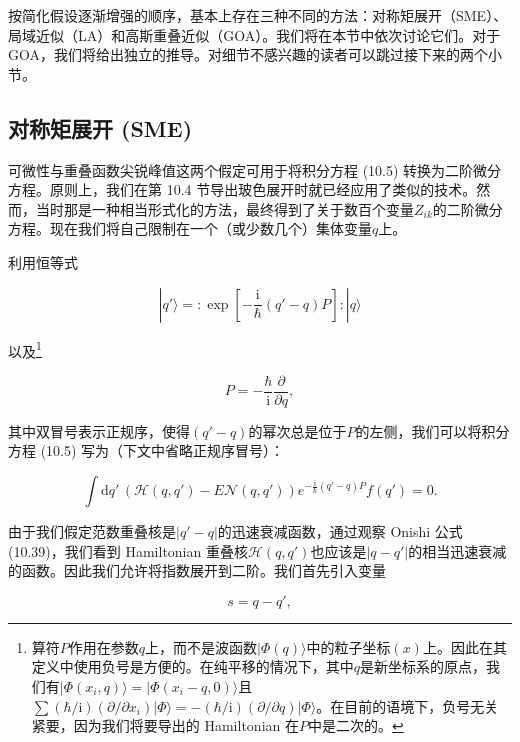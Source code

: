 按简化假设逐渐增强的顺序，基本上存在三种不同的方法：对称矩展开（SME）、局域近似（LA）和高斯重叠近似（GOA）。我们将在本节中依次讨论它们。对于
GOA，我们将给出独立的推导。对细节不感兴趣的读者可以跳过接下来的两个小节。

\subsection{对称矩展开 (SME)}

可微性与重叠函数尖锐峰值这两个假定可用于将积分方程 (10.5) 转换为二阶微分方程。原则上，我们在第 10.4 节导出玻色展开时就已经应用了类似的技术。然而，当时那是一种相当形式化的方法，最终得到了关于数百个变量$Z_{ik}$的二阶微分方程。现在我们将自己限制在一个（或少数几个）集体变量$q$上。

利用恒等式

\begin{equation}
|q'\rangle={:}\exp\left[-\frac{\mathrm{i}}{\hbar}(q'-q)P\right]{:}|q\rangle\label{eq:10.91}
\end{equation}

以及\footnote{算符$P$作用在参数$q$上，而不是波函数$|\Phi(q)\rangle$中的粒子坐标$(x)$上。因此在其定义中使用负号是方便的。在纯平移的情况下，其中$q$是新坐标系的原点，我们有$|\Phi(x_{i},q)\rangle=|\Phi(x_{i}-q,0)\rangle$且$\sum(\hbar/\mathrm{i})(\partial/\partial x_{i})|\Phi\rangle=-(\hbar/\mathrm{i})(\partial/\partial q)|\Phi\rangle$。在目前的语境下，负号无关紧要，因为我们将要导出的
Hamiltonian 在$P$中是二次的。}

\begin{equation}
P=-\frac{\hbar}{\mathrm{i}}\frac{\partial}{\partial q},\label{eq:10.92}
\end{equation}

其中双冒号表示正规序，使得$(q'-q)$的幂次总是位于$P$的左侧，我们可以将积分方程 (10.5) 写为（下文中省略正规序冒号）：

\begin{equation}
\int\mathrm{d}q'\,(\mathscr{H}(q,q')-E\mathscr{N}(q,q'))e^{-\frac{\mathrm{i}}{\hbar}(q'-q)P}f(q')=0.\label{eq:10.93}
\end{equation}

由于我们假定范数重叠核是$|q'-q|$的迅速衰减函数，通过观察 Onishi 公式 (10.39)，我们看到 Hamiltonian
重叠核$\mathscr{H}(q,q')$也应该是$|q-q'|$的相当迅速衰减的函数。因此我们允许将指数展开到二阶。我们首先引入变量

\begin{equation}
s=q-q',\label{eq:10.94}
\end{equation}

